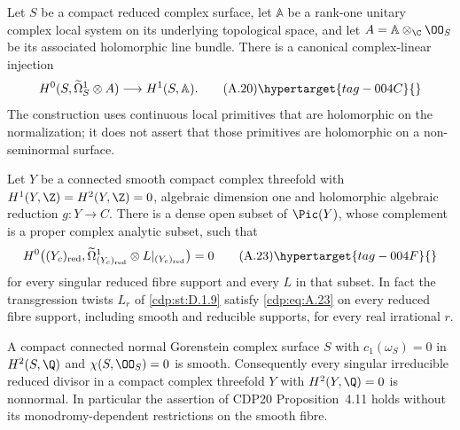 \begin{proposition}\hypertarget{tag-01AW}{}\label{cdp:st:A.4.7}


Let $S$ be a compact reduced complex surface, let $\mathbb A$ be a rank-one unitary complex local system on its underlying topological space, and let $A=\mathbb A\otimes_{\C}\OO_S$ be its associated holomorphic line bundle. There is a canonical complex-linear injection
\[
 H^0(S,\widetilde\Omega_S^1\otimes A)
       \longrightarrow H^1(S,\mathbb A).
 \tag{A.20}\hypertarget{tag-004C}{}\label{cdp:eq:A.20}
\]
The construction uses continuous local primitives that are holomorphic on the normalization; it does not assert that those primitives are holomorphic on a non-seminormal surface.
\end{proposition}

\begin{proposition}\hypertarget{tag-01AY}{}\label{cdp:st:A.4.9}


Let $Y$ be a connected smooth compact complex threefold with $H^1(Y,\Z)=H^2(Y,\Z)=0$, algebraic dimension one and holomorphic algebraic reduction $g:Y\to C$. There is a dense open subset of $\Pic(Y)$, whose complement is a proper complex analytic subset, such that
\[
 H^0\bigl((Y_c)_{\rm red},
       \widetilde\Omega^1_{(Y_c)_{\rm red}}\otimes L|_{(Y_c)_{\rm red}}\bigr)=0
 \tag{A.23}\hypertarget{tag-004F}{}\label{cdp:eq:A.23}
\]
for every singular reduced fibre support and every $L$ in that subset. In fact the transgression twists $L_r$ of \ref{cdp:st:D.1.9} satisfy \eqref{cdp:eq:A.23} on every reduced fibre support, including smooth and reducible supports, for every real irrational $r$.
\end{proposition}

\begin{proposition}\hypertarget{tag-01BA}{}\label{cdp:st:A.5.2}


A compact connected normal Gorenstein complex surface $S$ with $c_1(\omega_S)=0$ in $H^2(S,\Q)$ and $\chi(S,\OO_S)=0$ is smooth. Consequently every singular irreducible reduced divisor in a compact complex threefold $Y$ with $H^2(Y,\Q)=0$ is nonnormal. In particular the assertion of CDP20 Proposition~4.11 holds without its monodromy-dependent restrictions on the smooth fibre.
\end{proposition}

